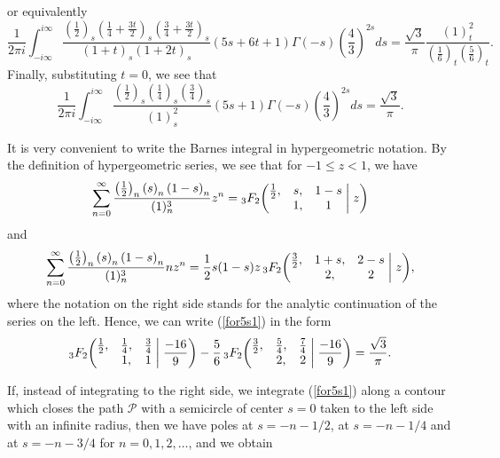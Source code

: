 \documentclass[12pt,a4paper]{amsart}
\begin{document}
or equivalently
\[
\frac{1}{2 \pi i} \int_{-i\infty}^{i\infty} \frac{\left( \frac{1}{2} \right)_{\!s} \left( \frac{1}{4}+\frac{3t}{2} \right)_{\!s} \left( \frac{3}{4}+\frac{3t}{2} \right)_{\!s}}{(1+t)_{\!s} (1+2t)_{\!s}}   (5s+6t+1) \Gamma(-s)\left( \frac{4}{3} \right)^{2s}ds=\frac{\sqrt{3}}{\pi} \frac{(1)_t^2}{\left( \frac{1}{6} \right)_t \left( \frac{5}{6} \right)_t}.
\]
Finally, substituting $t=0$, we see that
\begin{equation}\label{for5s1}
\frac{1}{2 \pi i} \int_{-i\infty}^{i\infty} \frac{\left( \frac{1}{2} \right)_{\!s} \left( \frac{1}{4} \right)_{\!s} \left( \frac{3}{4} \right)_{\!s}}{(1)_{\!s}^2}(5s+1) \Gamma(-s)\left( \frac{4}{3} \right)^{2s}ds=\frac{\sqrt{3}}{\pi}.
\end{equation}
\par It is very convenient to write the Barnes integral in hypergeometric notation. By the definition of hypergeometric series, we see that for $-1 \leq z < 1$, we have
\[
\sum_{n=0}^{\infty} \frac{\left( \frac{1}{2} \right)_n \left( s \right)_n \left( 1-s \right)_n}{(1)_n^3}z^n =
{}_3F_2\biggl(\begin{matrix}
\frac12, & s, & 1-s \\
& 1, & 1 \end{matrix} \biggm| z\biggr)
\]
and
\[
\sum_{n=0}^{\infty} \frac{\left( \frac{1}{2} \right)_n \left( s \right)_n \left( 1-s \right)_n}{(1)_n^3} nz^n = \frac12 s(1-s)z \,
{}_3F_2\biggl(\begin{matrix}
\frac32, & 1+s, & 2-s \\
& 2, & 2 \end{matrix} \biggm| z\biggr),
\]
where the notation on the right side stands for the analytic continuation of the series on the left. Hence, we can write (\ref{for5s1}) in the form
\[
{}_3F_2\biggl(\begin{matrix}
\frac12, & \frac14, & \frac34 \\
& 1, & 1 \end{matrix} \biggm| \frac{-16}{9} \biggr)-\frac{5}{6} \,
{}_3F_2\biggl(\begin{matrix}
\frac32, & \frac54, & \frac74 \\
& 2, & 2 \end{matrix} \biggm| \frac{-16}{9} \biggr)=\frac{\sqrt{3}}{\pi}.
\]
\par If, instead of integrating to the right side, we integrate (\ref{for5s1}) along a contour which closes the path $\mathcal{P}$ with a semicircle of center $s=0$ taken to the left side with an infinite radius, then we have poles at $s=-n-1/2$, at $s=-n-1/4$ and at $s=-n-3/4$ for $n=0,1,2, \dots$, and we obtain
\end{document}
